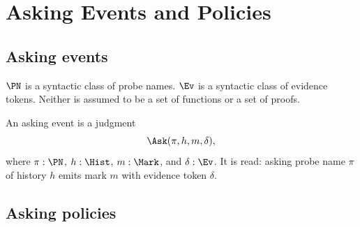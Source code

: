 \chapter{Asking Events and Policies}
\label{ch:core-asking-events-and-policies}

\section{Asking events}

\begin{definition}
\(\PN\) is a syntactic class of probe names. \(\Ev\) is a syntactic class of evidence tokens. Neither is assumed to be a set of functions or a set of proofs.
\end{definition}

\begin{definition}
\label{def:asking-event}
\label{def:asking-event-evidence-witness}
An asking event is a judgment
$$
\Ask(\pi,h,m,\delta),
$$
where \(\pi:\PN\), \(h:\Hist\), \(m:\Mark\), and \(\delta:\Ev\). It is read: asking probe name \(\pi\) of history \(h\) emits mark \(m\) with evidence token \(\delta\).
\end{definition}

\section{Asking policies}

